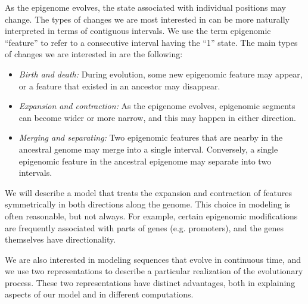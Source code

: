 \documentclass[11pt]{article}
\begin{document}
As the epigenome evolves, the state associated with individual
positions may change. The types of changes we are most interested in
can be more naturally interpreted in terms of contiguous intervals. We
use the term epigenomic ``feature'' to refer to a consecutive interval
having the ``1'' state. The main types of changes we are interested in
are the following:
\begin{itemize}
\item {\it Birth and death:} During evolution, some new epigenomic
  feature may appear, or a feature that existed in an ancestor may
  disappear. %
\item {\it Expansion and contraction:} As the epigenome evolves,
  epigenomic segments can become wider or more narrow, and this may
  happen in either direction.
\item {\it Merging and separating:} Two epigenomic features that are
  nearby in the ancestral genome may merge into a single interval.
  Conversely, a single epigenomic feature in the ancestral epigenome
  may separate into two intervals.
\end{itemize}
We will describe a model that treats the expansion and contraction of
features symmetrically in both directions along the genome.  This
choice in modeling is often reasonable, but not always. For example,
certain epigenomic modifications are frequently associated with parts
of genes (e.g. promoters), and the genes themselves have
directionality.

We are also interested in modeling sequences that evolve in continuous
time, and we use two representations to describe a particular
realization of the evolutionary process. These two representations
have distinct advantages, both in explaining aspects of our model and
in different computations.
\end{document}
